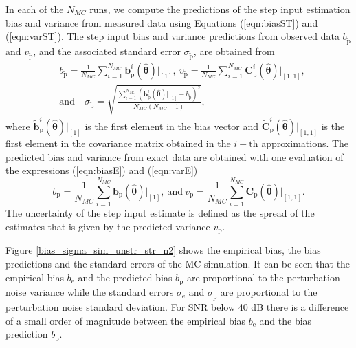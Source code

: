 In each of the $N_{MC}$ runs, we compute the predictions of the step input estimation bias and variance from measured data using Equations (\ref{eqn:biasST}) and (\ref{eqn:varST}). 
The step input bias and variance predictions from observed data $b_{\widetilde{\mathrm{p}}}$ and $v_{\widetilde{\mathrm{p}}}$, and the associated standard error $\sigma_{\widetilde{\mathrm{p}}}$, are obtained from
\begin{equation} \begin{aligned} & b_{\widetilde{\mathrm{p}}} = \frac{1}{N_{MC}} \sum_{i=1}^{N_{MC}}{ \mathbf{b}_{\widetilde{\mathrm{p}}}^i \left( \widehat{\bm{\theta}} \right) \big|_{\left[1\right]} }, \ v_{\widetilde{\mathrm{p}}} = \frac{1}{N_{MC}} \sum_{i=1}^{N_{MC}}{ \mathrm{\mathbf{C}}_{\widetilde{\mathrm{p}}}^i \left( \widehat{\bm{\theta}} \right) \big|_{\left[1,1\right]} },  \\ & \mathrm{and} \quad \sigma_{\widetilde{\mathrm{p}}} = \sqrt{   \frac{ \sum_{i=1}^{N_{MC}}{ \left( \mathbf{b}_{\widetilde{\mathrm{p}}}^i \left( \widehat{\bm{\theta}} \right) \big|_{\left[1\right]} - b_{\widetilde{\mathrm{p}}} \right)^2 } }{N_{MC}\left( N_{MC}-1 \right)}  } , \end{aligned} \end{equation}
where $\widetilde{\mathbf{b}}_{\mathrm{p}}^i \left( \widehat{\bm{\theta}} \right) \big|_{\left[1\right]}$ is the first element in the bias vector and $\widetilde{\mathbf{C}}_{\mathrm{p}}^i \left( \widehat{\bm{\theta}} \right) \big|_{\left[1,1\right]}$ is the first element in the covariance matrix obtained in the $i-\mathrm{th}$ approximations.
The predicted bias and variance from exact data are obtained with one evaluation of the expressions
(\ref{eqn:biasE}) and (\ref{eqn:varE})
\begin{equation} b_{\mathrm{p}} = \frac{1}{N_{MC}} \sum_{i=1}^{N_{MC}}{ \mathbf{b}_{\mathrm{p}} \left( \widehat{\bm{\theta}} \right) \big|_{\left[1\right]} }, \ \mathrm{and} \ v_{\mathrm{p}} = \frac{1}{N_{MC}} \sum_{i=1}^{N_{MC}}{ \mathrm{\mathbf{C}}_{\mathrm{p}} \left( \widehat{\bm{\theta}} \right) \big|_{\left[1,1\right]} } . \end{equation}
The uncertainty of the step input estimate is defined as the spread of the estimates that is given by the predicted variance $v_{\mathrm{p}}$.

Figure \ref{bias_sigma_sim_unstr_str_n2} shows the empirical bias, the bias predictions and the standard errors of the MC simulation.
It can be seen that the empirical bias $b_\mathrm{e}$ and the predicted bias $b_{\widetilde{\mathrm{p}}}$ are proportional to the perturbation noise variance while the standard errors $\sigma_\mathrm{e}$ and $\sigma_{\widetilde{\mathrm{p}}}$ are proportional to the perturbation noise standard deviation.
For SNR below 40 dB there is a difference of a small order of magnitude between the empirical bias $b_\mathrm{e}$ and the bias prediction $b_{\widetilde{\mathrm{p}}}$. 

